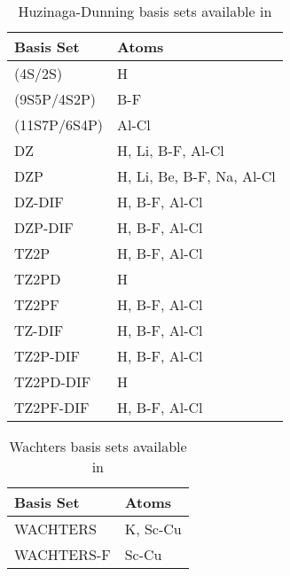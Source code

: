 \begin{table}[tbp]
\caption{Huzinaga-Dunning basis sets available in \PSIthree}
\label{table:dunningbasis}
\begin{center}
\begin{tabular}{|l|l|}
\hline
\hline
Basis Set 		&Atoms   	\\
\hline
	(4S/2S)			& H		\\
	(9S5P/4S2P)		& B-F			\\
	(11S7P/6S4P)		& Al-Cl			\\
	DZ			& H, Li, B-F, Al-Cl		\\
	DZP			& H, Li, Be, B-F, Na, Al-Cl	\\
	DZ-DIF			& H, B-F, Al-Cl		\\
	DZP-DIF			& H, B-F, Al-Cl		\\
	TZ2P			& H, B-F, Al-Cl		\\
	TZ2PD			& H			\\
	TZ2PF			& H, B-F, Al-Cl		\\
	TZ-DIF			& H, B-F, Al-Cl		\\ 	
	TZ2P-DIF		& H, B-F, Al-Cl		\\
	TZ2PD-DIF		& H			\\
	TZ2PF-DIF		& H, B-F, Al-Cl		\\		
\hline
\hline
\end{tabular}
\end{center}
\end{table}

\begin{table}[tbp]
\caption{Wachters basis sets available in \PSIthree}
\label{table:wachtersbasis}
\begin{center}
\begin{tabular}{|l|l|}
\hline
\hline
Basis Set 		&Atoms   	\\ 
\hline
	WACHTERS		& K, Sc-Cu			\\
	WACHTERS-F		& Sc-Cu			\\
\hline
\hline
\end{tabular}
\end{center}
\end{table}

